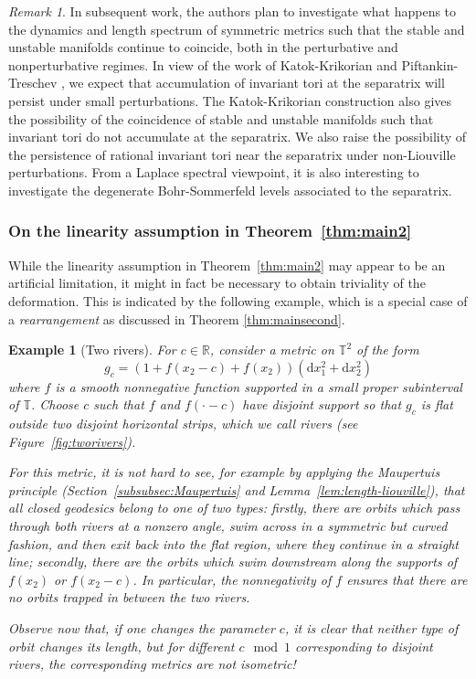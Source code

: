\documentclass[11pt,letterpaper,oneside]{amsart}
\newcommand{\R}{\mathbb{R}}
\newcommand{\T}{\mathbb{T}}
\newtheorem{exa}[theo]{Example}
\theoremstyle{definition}
\theoremstyle{remark}
\newtheorem{rema}[theo]{Remark}
\theoremstyle{definition}
\theoremstyle{remark}
\newcommand{\dif}{\mathrm{d}}
\begin{document}
\begin{rema}
In subsequent work, the authors plan to investigate what happens to the dynamics and length spectrum of symmetric metrics such that the stable and unstable manifolds continue to coincide, both in the perturbative and nonperturbative regimes. In view of the work of Katok-Krikorian \cite{KatokKrikorian} and Piftankin-Treschev \cite{PiftankinTreschev}, we expect that accumulation of invariant tori at the separatrix will persist under small perturbations. The Katok-Krikorian construction also gives the possibility of the coincidence of stable and unstable manifolds such that invariant tori do not accumulate at the separatrix. We also raise the possibility of the persistence of rational invariant tori near the separatrix under non-Liouville perturbations. From a Laplace spectral viewpoint, it is also interesting to investigate the degenerate Bohr-Sommerfeld levels associated to the separatrix.
\end{rema}




\subsubsection{On the linearity assumption in Theorem~\ref{thm:main2}}
While the linearity assumption in Theorem~\ref{thm:main2} may appear to be an artificial limitation, it might in fact be necessary to obtain triviality of the deformation. This is indicated by the following example, which is a special case of a \emph{rearrangement} as discussed in Theorem \ref{thm:mainsecond}.

\begin{exa}[Two rivers] \label{ex:two rivers}
{For $c \in \R$,} consider a metric on $\T^2$ of the form $$g_c = (1 + f(x_2 - c) + f(x_2)) (\dif x_1^2 + \dif x_2^2)$$  where $f$ is a smooth nonnegative function supported in a small proper subinterval of $\T$.
Choose $c$ such that $f$ and $f( \cdot - c)$ have disjoint support so that $g_{{c}}$ is flat outside two disjoint horizontal strips, which we call rivers (see Figure~\ref{fig:tworivers}).

For this metric, it is not hard to see, for example by applying the Maupertuis principle (Section~\ref{subsubsec:Maupertuis} and Lemma~\ref{lem:length-liouville}), that all closed geodesics belong to one of two types: firstly, there are orbits which pass through both rivers at a nonzero angle, swim across in a symmetric but curved fashion, and then exit back into the flat region, where they continue in a straight line; secondly, there are the orbits which swim downstream along the supports of $f(x_2)$ or $f(x_2 - c)$. In particular, the nonnegativity of $f$ ensures that there are no orbits trapped in between the two rivers.

Observe now that, if one changes the parameter $c$, it is clear that neither type of orbit changes its length, but for different $c \mod 1$ corresponding to disjoint rivers, the corresponding metrics are not isometric! 
\end{exa}
\end{document}
